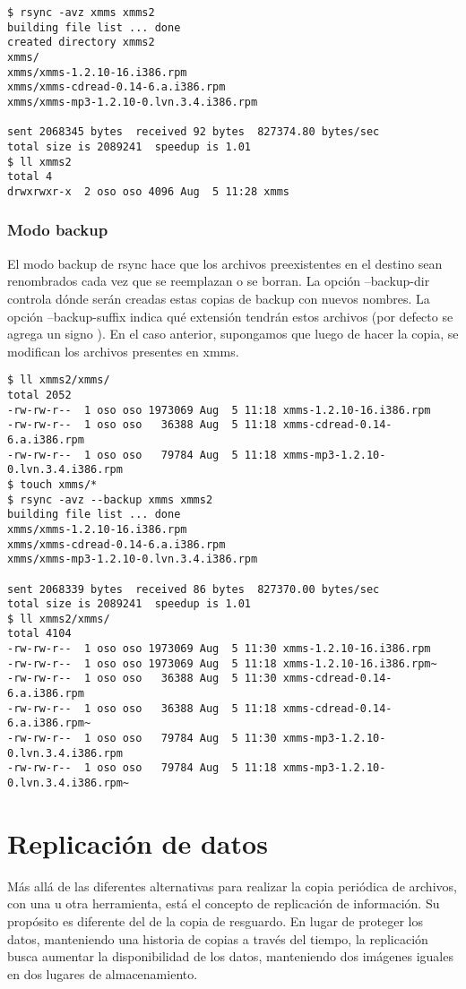\begin{lstlisting}
$ rsync -avz xmms xmms2
building file list ... done
created directory xmms2
xmms/
xmms/xmms-1.2.10-16.i386.rpm
xmms/xmms-cdread-0.14-6.a.i386.rpm
xmms/xmms-mp3-1.2.10-0.lvn.3.4.i386.rpm

sent 2068345 bytes  received 92 bytes  827374.80 bytes/sec
total size is 2089241  speedup is 1.01
$ ll xmms2
total 4
drwxrwxr-x  2 oso oso 4096 Aug  5 11:28 xmms
\end{lstlisting}

\subsubsection{Modo backup}
El modo backup de rsync hace que los archivos preexistentes en el destino sean renombrados cada vez que se reemplazan o se borran. La opción --backup-dir controla dónde serán creadas estas copias de backup con nuevos nombres. La opción --backup-suffix indica qué extensión tendrán estos archivos (por defecto se agrega un signo \quotes{\textasciitilde}).
En el caso anterior, supongamos que luego de hacer la copia, se modifican los archivos presentes en xmms.

\begin{lstlisting}
$ ll xmms2/xmms/
total 2052
-rw-rw-r--  1 oso oso 1973069 Aug  5 11:18 xmms-1.2.10-16.i386.rpm
-rw-rw-r--  1 oso oso   36388 Aug  5 11:18 xmms-cdread-0.14-6.a.i386.rpm
-rw-rw-r--  1 oso oso   79784 Aug  5 11:18 xmms-mp3-1.2.10-0.lvn.3.4.i386.rpm
$ touch xmms/*
$ rsync -avz --backup xmms xmms2
building file list ... done
xmms/xmms-1.2.10-16.i386.rpm
xmms/xmms-cdread-0.14-6.a.i386.rpm
xmms/xmms-mp3-1.2.10-0.lvn.3.4.i386.rpm

sent 2068339 bytes  received 86 bytes  827370.00 bytes/sec
total size is 2089241  speedup is 1.01
$ ll xmms2/xmms/
total 4104
-rw-rw-r--  1 oso oso 1973069 Aug  5 11:30 xmms-1.2.10-16.i386.rpm
-rw-rw-r--  1 oso oso 1973069 Aug  5 11:18 xmms-1.2.10-16.i386.rpm~
-rw-rw-r--  1 oso oso   36388 Aug  5 11:30 xmms-cdread-0.14-6.a.i386.rpm
-rw-rw-r--  1 oso oso   36388 Aug  5 11:18 xmms-cdread-0.14-6.a.i386.rpm~
-rw-rw-r--  1 oso oso   79784 Aug  5 11:30 xmms-mp3-1.2.10-0.lvn.3.4.i386.rpm
-rw-rw-r--  1 oso oso   79784 Aug  5 11:18 xmms-mp3-1.2.10-0.lvn.3.4.i386.rpm~
\end{lstlisting}

\section{Replicación de datos} 
Más allá de las diferentes alternativas para realizar la copia periódica de archivos, con una u otra herramienta, está el concepto de replicación de información. Su propósito es diferente del de la copia de resguardo. En lugar de proteger los datos, manteniendo una historia de copias a través del tiempo, la replicación busca aumentar la disponibilidad de los datos, manteniendo dos imágenes iguales en dos lugares de almacenamiento. 

